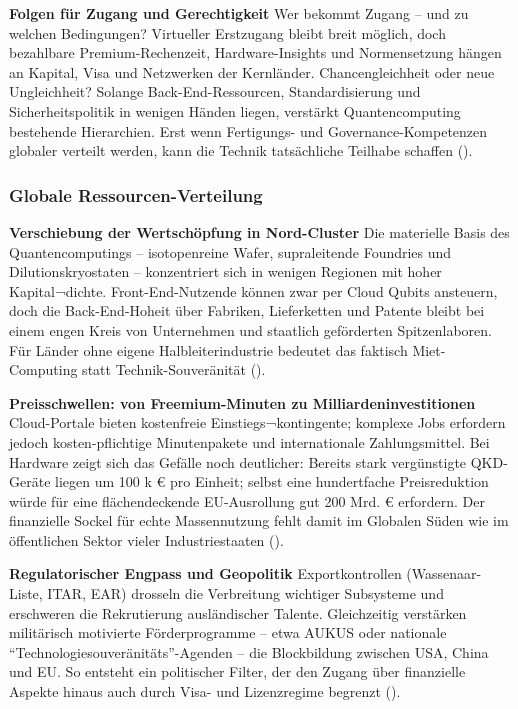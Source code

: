 \textbf{Folgen für Zugang und Gerechtigkeit} Wer bekommt Zugang – und zu welchen Bedingungen? Virtueller Erstzugang bleibt breit möglich, doch bezahlbare Premium-Rechenzeit, Hardware-Insights und Normensetzung hängen an Kapital, Visa und Netzwerken der Kernländer.
Chancengleichheit oder neue Ungleichheit?
Solange Back-End-Ressourcen, Standardisierung und Sicherheitspolitik in wenigen Händen liegen, verstärkt Quantencomputing bestehende Hierarchien. Erst wenn Fertigungs- und Governance-Kompetenzen globaler verteilt werden, kann die Technik tatsächliche Teilhabe schaffen (\cite{seskirDemocratizationQuantumTechnologies2022}).


\subsubsection{Globale Ressourcen-Verteilung}
\textbf{Verschiebung der Wertschöpfung in Nord-Cluster}
Die materielle Basis des Quantencomputings – isotopenreine Wafer, supraleitende Foundries und Dilutionskryostaten – konzentriert sich in wenigen Regionen mit hoher Kapital¬dichte. Front-End-Nutzende können zwar per Cloud Qubits ansteuern, doch die Back-End-Hoheit über Fabriken, Lieferketten und Patente bleibt bei einem engen Kreis von Unternehmen und staatlich geförderten Spitzenlaboren. Für Länder ohne eigene Halbleiterindustrie bedeutet das faktisch Miet-Computing statt Technik-Souveränität (\cite{seskirDemocratizationQuantumTechnologies2022}).

\textbf{Preisschwellen: von Freemium-Minuten zu Milliardeninvestitionen}
Cloud-Portale bieten kostenfreie Einstiegs¬kontingente; komplexe Jobs erfordern jedoch kosten-pflichtige Minutenpakete und internationale Zahlungsmittel. Bei Hardware zeigt sich das Gefälle noch deutlicher: Bereits stark vergünstigte QKD-Geräte liegen um 100 k € pro Einheit; selbst eine hundertfache Preisreduktion würde für eine flächendeckende EU-Ausrollung gut 200 Mrd. € erfordern. Der finanzielle Sockel für echte Massennutzung fehlt damit im Globalen Süden wie im öffentlichen Sektor vieler Industriestaaten (\cite{seskirDemocratizationQuantumTechnologies2022}).

\textbf{Regulatorischer Engpass und Geopolitik}
Exportkontrollen (Wassenaar-Liste, ITAR, EAR) drosseln die Verbreitung wichtiger Subsysteme und erschweren die Rekrutierung ausländischer Talente. Gleichzeitig verstärken militärisch motivierte Förderprogramme – etwa AUKUS oder nationale “Technologiesouveränitäts”-Agenden – die Blockbildung zwischen USA, China und EU. So entsteht ein politischer Filter, der den Zugang über finanzielle Aspekte hinaus auch durch Visa- und Lizenzregime begrenzt (\cite{seskirDemocratizationQuantumTechnologies2022}).

